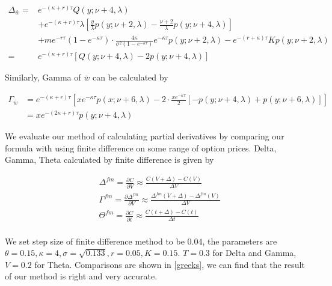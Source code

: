 \begin{equation}\label{delta}
    \begin{aligned}
        \Delta_{\bar{w}}=&  e^{ -(\kappa+r) \tau} Q(y ; \nu+4, \lambda) \\
        &+ e^{ -(\kappa+r) \tau} \lambda \left[\frac{y}{\lambda} p(y ; \nu+2, \lambda)-\frac{\nu+2}{\lambda} p(y ; \nu+4, \lambda)\right]\\
        &+ m e^{-r \tau}(1-e^{-\kappa \tau}) \cdot \frac{4 \kappa}{\sigma^{2}(1-e^{-\kappa \tau})} e^{-\kappa \tau} p(y ; \nu+2, \lambda) -e^{-(r+\kappa) \tau} K  p(y ; \nu+2, \lambda) \\
        =& e^{ -(\kappa+r) \tau} [Q(y; \nu+4, \lambda)-2p(y ; \nu+4, \lambda)] 
        \end{aligned}
\end{equation}

Similarly, Gamma of $\bar{w}$ can be calculated by

\begin{equation}\label{gamma}
    \begin{aligned}
        \Gamma_{\bar{w}}&= e^{ -(\kappa+r) \tau} \left[x e^{-\kappa \tau} p(x ; \nu+6, \lambda)-2 \cdot \frac{x e^{-\kappa \tau}}{2} [-p(y ; \nu+4, \lambda)+p(y ; \nu+6, \lambda)]\right] \\
        &= xe^{ -(2\kappa+r) \tau}p(y;\nu+4,\lambda)
    \end{aligned}
\end{equation}

We evaluate our method of calculating partial derivatives by comparing our formula with using finite difference on some range of option prices. Delta, Gamma, Theta calculated by finite difference is given by

$$
\begin{aligned}
    &\Delta^{fm} = \frac{\partial C}{\partial V} \approx \frac{C(V+\Delta)-C(V)}{\Delta V} \\
    &\Gamma^{fm} = \frac{\partial \Delta^{fm}}{\partial V} \approx \frac{\Delta^{fm}(V+\Delta)-\Delta^{fm}(V)}{\Delta V} \\
    &\Theta^{fm} = \frac{\partial C}{\partial t} \approx \frac{C(t+\Delta)-C(t)}{\Delta t} \\
\end{aligned}
$$

\noindent We set step size of finite difference method to be $0.04$, the parameters are $\theta = 0.15, \kappa = 4,\sigma = \sqrt{0.133},r = 0.05, K = 0.15$. $T=0.3$ for Delta and Gamma, $V=0.2$ for Theta. Comparisons are shown in \ref{greeks}, we can find that the result of our method is right and very accurate.

